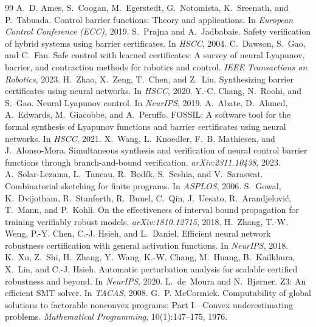\documentclass[10pt]{article}
\begin{document}
{\small

\begin{thebibliography}{99}
 A.~D. Ames, S.~Coogan, M.~Egerstedt, G.~Notomista, K.~Sreenath, and P.~Tabuada. Control barrier functions: Theory and applications. In \emph{European Control Conference (ECC)}, 2019.
 S.~Prajna and A.~Jadbabaie. Safety verification of hybrid systems using barrier certificates. In \emph{HSCC}, 2004.
 C.~Dawson, S.~Gao, and C.~Fan. Safe control with learned certificates: A survey of neural Lyapunov, barrier, and contraction methods for robotics and control. \emph{IEEE Transactions on Robotics}, 2023.
 H.~Zhao, X.~Zeng, T.~Chen, and Z.~Liu. Synthesizing barrier certificates using neural networks. In \emph{HSCC}, 2020.
 Y.-C. Chang, N.~Roohi, and S.~Gao. Neural Lyapunov control. In \emph{NeurIPS}, 2019.
 A.~Abate, D.~Ahmed, A.~Edwards, M.~Giacobbe, and A.~Peruffo. FOSSIL: A software tool for the formal synthesis of Lyapunov functions and barrier certificates using neural networks. In \emph{HSCC}, 2021.
 X.~Wang, L.~Knoedler, F.~B. Mathiesen, and J.~Alonso-Mora. Simultaneous synthesis and verification of neural control barrier functions through branch-and-bound verification. \emph{arXiv:2311.10438}, 2023.
 A.~Solar-Lezama, L.~Tancau, R.~Bod\'ik, S.~Seshia, and V.~Saraswat. Combinatorial sketching for finite programs. In \emph{ASPLOS}, 2006.
 S.~Gowal, K.~Dvijotham, R.~Stanforth, R.~Bunel, C.~Qin, J.~Uesato, R.~Arandjelovi\'c, T.~Mann, and P.~Kohli. On the effectiveness of interval bound propagation for training verifiably robust models. \emph{arXiv:1810.12715}, 2018.
 H.~Zhang, T.-W. Weng, P.-Y. Chen, C.-J. Hsieh, and L.~Daniel. Efficient neural network robustness certification with general activation functions. In \emph{NeurIPS}, 2018.
 K.~Xu, Z.~Shi, H.~Zhang, Y.~Wang, K.-W. Chang, M.~Huang, B.~Kailkhura, X.~Lin, and C.-J. Hsieh. Automatic perturbation analysis for scalable certified robustness and beyond. In \emph{NeurIPS}, 2020.
 L.~de~Moura and N.~Bj{\o}rner. Z3: An efficient SMT solver. In \emph{TACAS}, 2008.
 G.~P. McCormick. Computability of global solutions to factorable nonconvex programs: Part I---Convex underestimating problems. \emph{Mathematical Programming}, 10(1):147--175, 1976.
\end{thebibliography}
}
\end{document}

